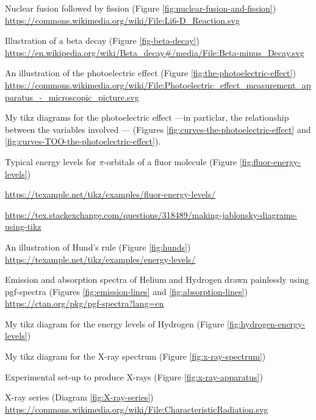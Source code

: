 \documentclass[oneside]{book}
\begin{document}
\begin{enumerate}[label={[\arabic*]}]
    \item\label{source:nuclear-fusion-and-fission} 
    Nuclear fusion followed by fission
    (Figure \ref{fig:nuclear-fusion-and-fission}) \url{https://commons.wikimedia.org/wiki/File:Li6-D_Reaction.svg} 
    \item\label{source:beta-decay} Illustration of a beta decay (Figure \ref{fig-beta-decay}) \url{https://en.wikipedia.org/wiki/Beta_decay#/media/File:Beta-minus_Decay.svg}
    \item\label{source:the-photoelectric-effect} An illustration of the photoelectric effect (Figure \ref{fig:the-photoelectric-effect}) \url{https://commons.wikimedia.org/wiki/File:Photoelectric_effect_measurement_apparatus_-_microscopic_picture.svg}
    \item\label{source:curves-the-photoelectric-effect} My tikz diagrams for the photoelectric effect ---in particlar, the relationship between the variables involved --- (Figures \ref{fig:curves-the-photoelectric-effect} and \ref{fig:curves-TOO-the-photoelectric-effect}).
    \item\label{source:fluor-energy-levels} Typical energy levels for \(\pi\)-orbitals of a fluor molecule (Figure \ref{fig:fluor-energy-levels}) 
    
    \url{https://texample.net/tikz/examples/fluor-energy-levels/}

    \url{https://tex.stackexchange.com/questions/318489/making-jablonsky-diagrams-using-tikz}
    \item\label{source:hunds} An illustration of Hund's rule (Figure \ref{fig:hunds}) \url{https://texample.net/tikz/examples/energy-levels/}
    \item\label{source:emission-and-absorption-lines} Emission and absorption spectra of Helium and Hydrogen drawn painlessly using pgf-spectra (Figures \ref{fig:emission-lines} and \ref{fig:absorption-lines}) \url{https://ctan.org/pkg/pgf-spectra?lang=en} 
    \item\label{source:hydrogen-energy-levels} My tikz diagram for the energy levels of Hydrogen (Figure \ref{fig:hydrogen-energy-levels})
    \item\label{source:x-ray-spectrum} My tikz diagram for the X-ray spectrum (Figure \ref{fig:x-ray-spectrum})
    \item\label{source:x-ray-apparatus} Experimental set-up to produce X-rays (Figure \ref{fig:x-ray-apparatus})
    \item\label{source:X-ray-series} X-ray series (Diagram \ref{fig:X-ray-series}) \url{https://commons.wikimedia.org/wiki/File:CharacteristicRadiation.svg}
\end{enumerate}
\end{document}
